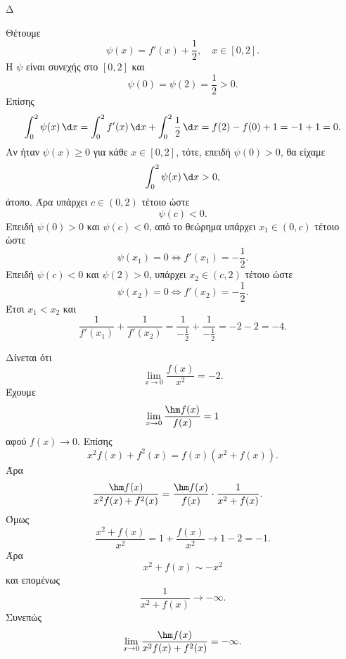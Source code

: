\begin{thema}{Δ}
\begin{erwthma}
\item Θέτουμε
\[
\psi(x)=f'(x)+\frac{1}{2},\quad x\in[0,2].
\]
Η $\psi$ είναι συνεχής στο $[0,2]$ και
\[
\psi(0)=\psi(2)=\frac{1}{2}>0.
\]
Επίσης
\[
\dint_0^2\psi(x)\,\d x
=\dint_0^2 f'(x)\,\d x+\dint_0^2\frac{1}{2}\,\d x
=f(2)-f(0)+1
=-1+1=0.
\]
Αν ήταν $\psi(x)\geq0$ για κάθε $x\in[0,2]$, τότε, επειδή $\psi(0)>0$, θα είχαμε
\[
\dint_0^2\psi(x)\,\d x>0,
\]
άτοπο. Άρα υπάρχει $c\in(0,2)$ τέτοιο ώστε
\[
\psi(c)<0.
\]
Επειδή $\psi(0)>0$ και $\psi(c)<0$, από το θεώρημα  υπάρχει $x_1\in(0,c)$ τέτοιο ώστε
\[
\psi(x_1)=0
\Leftrightarrow f'(x_1)=-\frac{1}{2}.
\]
Επειδή $\psi(c)<0$ και $\psi(2)>0$, υπάρχει $x_2\in(c,2)$ τέτοιο ώστε
\[
\psi(x_2)=0
\Leftrightarrow f'(x_2)=-\frac{1}{2}.
\]
Έτσι $x_1<x_2$ και
\[
\frac{1}{f'(x_1)}+\frac{1}{f'(x_2)}
=\frac{1}{-\frac{1}{2}}+\frac{1}{-\frac{1}{2}}
=-2-2=-4.
\]

\item Δίνεται ότι
\[
\lim_{x\to0}\frac{f(x)}{x^2}=-2.
\]
Έχουμε
\[
\lim_{x\to0}\frac{\hm f(x)}{f(x)}=1
\]
αφού $f(x)\to0$. Επίσης
\[
x^2f(x)+f^2(x)=f(x)(x^2+f(x)).
\]
Άρα
\begin{align*}
\frac{\hm f(x)}{x^2f(x)+f^2(x)}
&=\frac{\hm f(x)}{f(x)}\cdot\frac{1}{x^2+f(x)}.
\end{align*}
Όμως
\[
\frac{x^2+f(x)}{x^2}
=1+\frac{f(x)}{x^2}\to 1-2=-1.
\]
Άρα
\[
x^2+f(x)\sim -x^2
\]
και επομένως
\[
\frac{1}{x^2+f(x)}\to-\infty.
\]
Συνεπώς
\[
{\lim_{x\to0}\frac{\hm f(x)}{x^2f(x)+f^2(x)}=-\infty}.
\]
\end{erwthma}
\end{thema}
